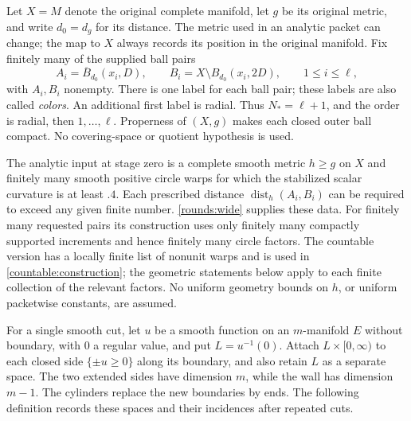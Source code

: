 \documentclass[11pt]{article}
\numberwithin{equation}{section}
\theoremstyle{definition}
\theoremstyle{remark}
\begin{document}
Let $X=M$ denote the original complete manifold, let $g$ be its original
metric, and write $d_0=d_g$ for its distance.  The metric used in an analytic
packet can change; the map to $X$ always records its position in the
original manifold.  Fix finitely many of the supplied ball pairs
\[
 A_i=\overline B_{d_0}(x_i,D),\qquad
 B_i=X\setminus B_{d_0}(x_i,2D),\qquad 1\le i\le\ell,
\]
with $A_i,B_i$ nonempty. There is one label for each ball pair; these
labels are also called \emph{colors}. An additional first label is radial.
Thus $N_*=\ell+1$, and the order is
radial, then $1,\ldots,\ell$.  Properness of $(X,g)$ makes each closed
outer ball compact.  No covering-space or quotient hypothesis is used.

The analytic input at stage zero is a complete smooth metric $h\ge g$ on $X$
and finitely many smooth positive circle warps for which the stabilized
scalar curvature is at least $.4$.  Each prescribed distance
$\operatorname{dist}_h(A_i,B_i)$ can be required to exceed any given finite number.
\cref{rounds:wide} supplies these data.  For finitely many requested
pairs its construction uses only finitely many compactly supported
increments and hence finitely many circle factors.  The countable
version has a locally finite list of nonunit warps and is used in
\cref{countable:construction}; the geometric statements below apply to
each finite collection of the relevant factors.  No uniform geometry
bounds on $h$, or uniform packetwise constants, are assumed.

For a single smooth cut, let $u$ be a smooth function on an
$m$-manifold $E$ without boundary, with $0$ a regular value, and put
$L=u^{-1}(0)$.
Attach $L\times[0,\infty)$ to each closed side $\{\pm u\ge0\}$
along its boundary, and also retain $L$ as a separate space.
The two extended sides have dimension $m$, while the wall has dimension
$m-1$. The cylinders replace the new boundaries by ends.
The following definition records these spaces and their incidences
after repeated cuts.
\end{document}
